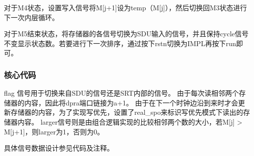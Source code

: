 \documentclass[a4paper]{article}
\begin{document}
对于M4状态，设置写入信号将M[j+1]设为temp（M[j]），然后切换回M3状态进行下一次内层循环。

对于M5结束状态，将存储器的各信号切换为SDU输入的信号，并且保持cycle信号不变显示状态数。若要进行下一次排序，通过按下rstn切换为IMPL再按下run即可。

\subsubsection{核心代码}
flag 信号用于切换来自SDU的信号还是SRT内部的信号。 由于每次读相邻两个存储器的内容，因此将dpra端口链接为a+1。
由于在下一个时钟边沿到来时才会更新存储器的内容，为了实现写优先，设置了real\_spo来标识写优先模式下读出的存储器内容。
larger信号则是由组合逻辑实现的比较相邻两个数的大小，若M[j] > M[j+1]，则larger为1，否则为0。

具体信号数据设计参见代码及注释。
\end{document}

